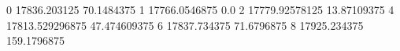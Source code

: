 0 17836.203125 70.1484375
1 17766.0546875 0.0
2 17779.92578125 13.87109375
4 17813.529296875 47.474609375
6 17837.734375 71.6796875
8 17925.234375 159.1796875
